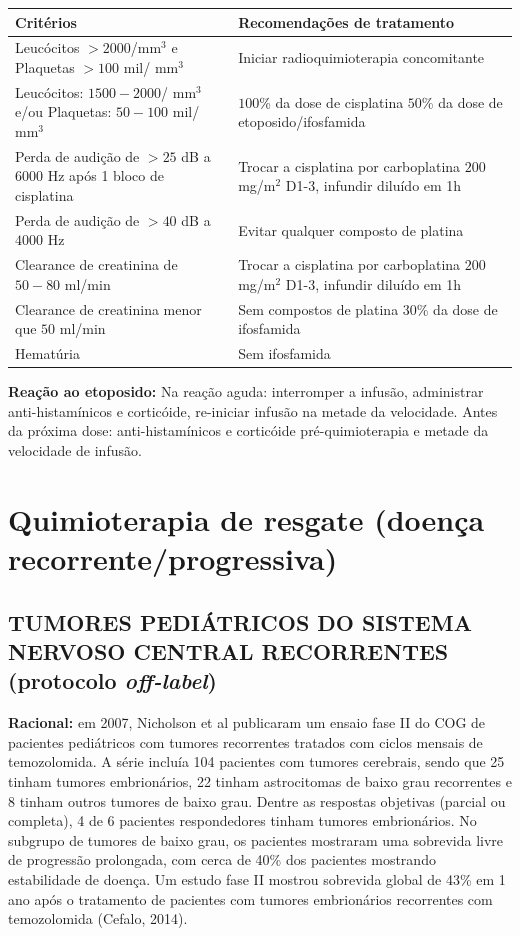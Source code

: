 \documentclass[11pt,a4paper,oldfontcommands]{memoir}
\begin{document}
\begin{center}
\begin{longtable}{p{5cm}|p{4.5cm}}
\hline
{\textbf{Critérios}}&{\textbf{Recomendações de tratamento}}\\
\hline
{Leucócitos \(> 2000\)/mm\(^3\) e Plaquetas \(> 100\) mil/ mm\(^3\)}&{Iniciar radioquimioterapia concomitante}\\
\hline
{Leucócitos: \(1500-2000\)/ mm\(^3\) e/ou Plaquetas: \(50-100\) mil/ mm\(^3\)}&{\(100\)\% da dose de cisplatina \(50\)\% da dose de etoposido/ifosfamida}\\
\hline
{Perda de audição de \(>25\) dB a \(6000\) Hz após 1 bloco de cisplatina}&{Trocar a cisplatina por carboplatina \(200\) mg/m\(^2\) D1-3, infundir diluído em 1h}\\
\hline
{Perda de audição de \(>40\) dB a \(4000\) Hz}&{Evitar qualquer composto de platina}\\
\hline
{Clearance de creatinina de \(50-80\) ml/min}&{Trocar a cisplatina por carboplatina \(200\) mg/m\(^2\) D1-3, infundir diluído em 1h}\\
\hline
{Clearance de creatinina menor que \(50\) ml/min}&{Sem compostos de platina \(30\)\% da dose de ifosfamida}\\
\hline
{Hematúria}&{Sem ifosfamida}\\
\hline
\end{longtable}

\end{center}

\textbf{Reação ao etoposido:}
Na reação aguda: interromper a infusão, administrar anti-histamínicos e corticóide, re-iniciar infusão na metade da velocidade.
Antes da próxima dose: anti-histamínicos e corticóide pré-quimioterapia e metade da velocidade de infusão.

\cleardoublepage
\chapter{Quimioterapia de resgate (doença recorrente/progressiva)}

\cleardoublepage

\section{TUMORES PEDIÁTRICOS DO SISTEMA NERVOSO CENTRAL RECORRENTES (protocolo \textit{off-label})}
{\let\thefootnote\relax{}}
\textbf{Racional:} em 2007, Nicholson et al publicaram um ensaio fase II do COG de pacientes pediátricos com tumores recorrentes tratados com ciclos mensais de temozolomida. A série incluía 104 pacientes com tumores cerebrais, sendo que 25 tinham tumores embrionários, 22 tinham astrocitomas de baixo grau recorrentes e 8 tinham outros tumores de baixo grau. Dentre as respostas objetivas (parcial ou completa), 4 de 6 pacientes respondedores tinham tumores embrionários. No subgrupo de tumores de baixo grau, os pacientes mostraram uma sobrevida livre de progressão prolongada, com cerca de 40\% dos pacientes mostrando estabilidade de doença. Um estudo fase II mostrou sobrevida global de 43\% em 1 ano após o tratamento de pacientes com tumores embrionários recorrentes com temozolomida (Cefalo, 2014).
\end{document}
